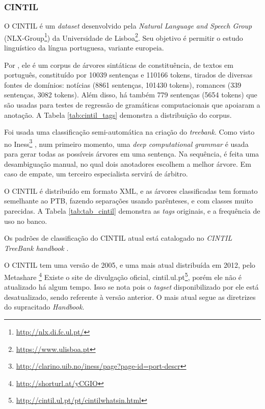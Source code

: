 \subsubsection{CINTIL}
\label{subsubsec:cintil}
O CINTIL é um \textit{dataset} desenvolvido pela \textit{Natural Language and Speech Group} (NLX-Group\footnote{ \url{http://nlx.di.fc.ul.pt/}}) da Universidade de Lisboa\footnote{\url{https://www.ulisboa.pt}}. Seu objetivo é permitir o estudo linguístico da língua portuguesa, variante europeia.

Por \cite[p~1]{narrativeDescriptionCintil}, ele é um corpus de árvores sintáticas de constituência, de textos em português, constituído por 10039 sentenças e 110166 tokens, tirados de diversas fontes de domínios: notícias (8861 sentenças, 101430 tokens), romances (339 sentenças, 3082 tokens). Além disso, há também 779 sentenças (5654 tokens) que são usadas para testes de regressão de gramáticas computacionais que apoiaram a anotação. A Tabela \ref{tab:cintil_tags} demonstra a distribuição do corpus.

\begin{center}

\end{center}

Foi usada uma classificação semi-automática na criação do \textit{treebank}. Como visto no Iness\footnote{\url{http://clarino.uib.no/iness/page?page-id=port-descr}} \cite{rosen2012open}, num primeiro momento, uma \textit{deep computational grammar} \cite{lxgram} é usada para gerar todas as possíveis árvores em uma sentença. Na sequência, é feita uma desambiguação manual, no qual dois anotadores escolhem a melhor árvore. Em caso de empate, um terceiro especialista servirá de árbitro.

O CINTIL é distribuído em formato XML, e as árvores classificadas tem formato semelhante ao PTB, fazendo separações usando parênteses, e com classes muito parecidas. A Tabela \ref{tab:tab_cintil} demonstra as \textit{tags} originais, e a frequência de uso no banco.

Os padrões de classificação do CINTIL atual está catalogado no \textit{CINTIL TreeBank handbook} \cite{cintil_handbook}.

O CINTIL tem uma versão de 2005, e uma mais atual distribuída em 2012, pelo Metashare
\footnote{\url{http://shorturl.at/yCGIO}}
Existe o site de divulgação oficial, cintil.ul.pt\footnote{\url{http://cintil.ul.pt/pt/cintilwhatsin.html}}, porém ele não é atualizado há algum tempo. Isso se nota pois o \textit{tagset} disponibilizado por ele está desatualizado, sendo referente à versão anterior. O mais atual segue as diretrizes do supracitado \textit{Handbook}.
